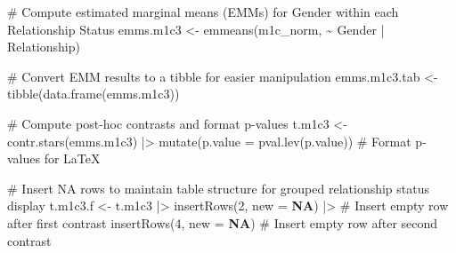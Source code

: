 \documentclass[
  bookmarksnumbered]{article}
\newenvironment{Shaded}{\begin{snugshade}}{\end{snugshade}}
\newcommand{\AttributeTok}[1]{\textcolor[rgb]{0.80,0.80,0.80}{#1}}
\newcommand{\CommentTok}[1]{\textcolor[rgb]{0.50,0.62,0.50}{#1}}
\newcommand{\ConstantTok}[1]{\textcolor[rgb]{0.86,0.64,0.64}{\textbf{#1}}}
\newcommand{\DecValTok}[1]{\textcolor[rgb]{0.86,0.86,0.80}{#1}}
\newcommand{\FunctionTok}[1]{\textcolor[rgb]{0.94,0.94,0.56}{#1}}
\newcommand{\NormalTok}[1]{\textcolor[rgb]{0.80,0.80,0.80}{#1}}
\newcommand{\OtherTok}[1]{\textcolor[rgb]{0.94,0.94,0.56}{#1}}
\newcommand{\SpecialCharTok}[1]{\textcolor[rgb]{0.86,0.64,0.64}{#1}}
\begin{document}
\begin{Shaded}
\begin{Highlighting}[]
\CommentTok{\# Compute estimated marginal means (EMMs) for Gender within each Relationship Status}
\NormalTok{emms.m1c3 }\OtherTok{\textless{}{-}} \FunctionTok{emmeans}\NormalTok{(m1c\_norm, }\SpecialCharTok{\textasciitilde{}}\NormalTok{ Gender }\SpecialCharTok{|}\NormalTok{ Relationship)}

\CommentTok{\# Convert EMM results to a tibble for easier manipulation}
\NormalTok{emms.m1c3.tab }\OtherTok{\textless{}{-}} \FunctionTok{tibble}\NormalTok{(}\FunctionTok{data.frame}\NormalTok{(emms.m1c3))}

\CommentTok{\# Compute post{-}hoc contrasts and format p{-}values}
\NormalTok{t.m1c3 }\OtherTok{\textless{}{-}} \FunctionTok{contr.stars}\NormalTok{(emms.m1c3) }\SpecialCharTok{|\textgreater{}}
  \FunctionTok{mutate}\NormalTok{(}\AttributeTok{p.value =} \FunctionTok{pval.lev}\NormalTok{(p.value)) }\CommentTok{\# Format p{-}values for LaTeX}

\CommentTok{\# Insert NA rows to maintain table structure for grouped relationship status display}
\NormalTok{t.m1c3.f }\OtherTok{\textless{}{-}}\NormalTok{ t.m1c3 }\SpecialCharTok{|\textgreater{}}
  \FunctionTok{insertRows}\NormalTok{(}\DecValTok{2}\NormalTok{, }\AttributeTok{new =} \ConstantTok{NA}\NormalTok{) }\SpecialCharTok{|\textgreater{}} \CommentTok{\# Insert empty row after first contrast}
  \FunctionTok{insertRows}\NormalTok{(}\DecValTok{4}\NormalTok{, }\AttributeTok{new =} \ConstantTok{NA}\NormalTok{) }\CommentTok{\# Insert empty row after second contrast}


\end{Highlighting}
\end{Shaded}
\end{document}
